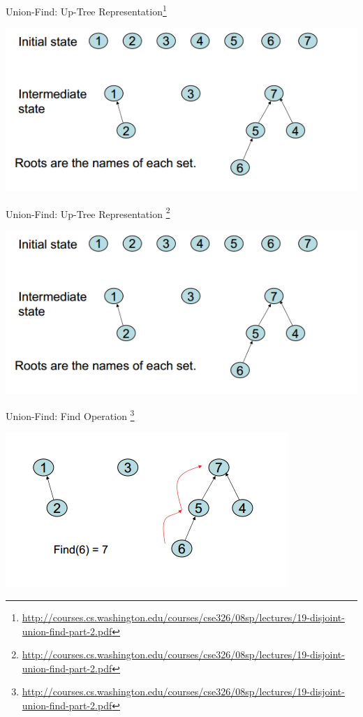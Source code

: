 \documentclass{beamer}
\begin{document}
\begin{frame}{Union-Find: Up-Tree Representation\footnote{\url{http://courses.cs.washington.edu/courses/cse326/08sp/lectures/19-disjoint-union-find-part-2.pdf}}}
    \begin{center}
        \includegraphics[scale=0.5]{unionFindTreeRep.png} 
    \end{center}
\end{frame}


\begin{frame}{Union-Find: Up-Tree Representation \footnote{\url{http://courses.cs.washington.edu/courses/cse326/08sp/lectures/19-disjoint-union-find-part-2.pdf}} }
    \begin{center}
        \includegraphics[scale=0.5]{unionFindTreeRep.png} 
    \end{center}
\end{frame}


\begin{frame}{Union-Find: Find Operation \footnote{\url{http://courses.cs.washington.edu/courses/cse326/08sp/lectures/19-disjoint-union-find-part-2.pdf}} } 
    \begin{center}
        \includegraphics[scale=0.5]{unionFindTreeRepFind.png} 
    \end{center}
\end{frame}
\end{document}
